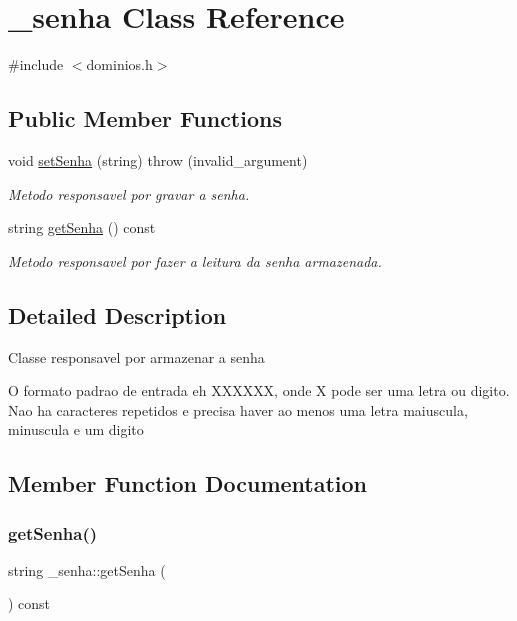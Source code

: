 \hypertarget{class__senha}{}\section{\+\_\+senha Class Reference}
\label{class__senha}


{\ttfamily \#include $<$dominios.\+h$>$}

\subsection*{Public Member Functions}
\begin{DoxyCompactItemize}
\item 
void \mbox{\hyperlink{class__senha_a5104da5b8a8b68cfeb0fb64823f5f053}{set\+Senha}} (string)  throw (invalid\+\_\+argument)
\begin{DoxyCompactList}\small\item\em Metodo responsavel por gravar a senha. \end{DoxyCompactList}\item 
string \mbox{\hyperlink{class__senha_a2c850cd5555af588289e8abd2b524887}{get\+Senha}} () const
\begin{DoxyCompactList}\small\item\em Metodo responsavel por fazer a leitura da senha armazenada. \end{DoxyCompactList}\end{DoxyCompactItemize}


\subsection{Detailed Description}
Classe responsavel por armazenar a senha

O formato padrao de entrada eh X\+X\+X\+X\+XX, onde X pode ser uma letra ou digito. Nao ha caracteres repetidos e precisa haver ao menos uma letra maiuscula, minuscula e um digito 

\subsection{Member Function Documentation}
\mbox{\label{class__senha_a2c850cd5555af588289e8abd2b524887}} 
\subsubsection{\texorpdfstring{getSenha()}{getSenha()}}
{\footnotesize\ttfamily string \+\_\+senha\+::get\+Senha (\begin{DoxyParamCaption}{ }\end{DoxyParamCaption}) const\hspace{0.3cm}{\ttfamily [inline]}}



